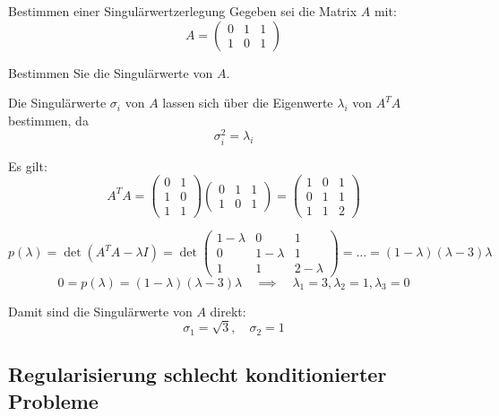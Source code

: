 \begin{example}{Bestimmen einer Singulärwertzerlegung}
    Gegeben sei die Matrix $A$  mit:
    \[
        A =
        \begin{pmatrix}
            0 & 1 & 1 \\
            1 & 0 & 1
        \end{pmatrix}
    \]

    Bestimmen Sie die Singulärwerte von $A$.

    \exampleseparator

    Die Singulärwerte $\sigma_i$ von $A$ lassen sich über die Eigenwerte $\lambda_i$ von $A^TA$ bestimmen, da
    \[
        \sigma_i^2 = \lambda_i
    \]

    Es gilt:
    \[
        A^TA =
        \begin{pmatrix}
            0 & 1 \\
            1 & 0 \\
            1 & 1
        \end{pmatrix}
        \begin{pmatrix}
            0 & 1 & 1 \\
            1 & 0 & 1
        \end{pmatrix}
        =
        \begin{pmatrix}
            1 & 0 & 1 \\
            0 & 1 & 1 \\
            1 & 1 & 2
        \end{pmatrix}
    \]

    \[
        p(\lambda) = \det(A^TA - \lambda I) = \det
        \begin{pmatrix}
            1 - \lambda & 0           & 1           \\
            0           & 1 - \lambda & 1           \\
            1           & 1           & 2 - \lambda
        \end{pmatrix}
        = \ldots = (1-\lambda)(\lambda-3)\lambda
    \]
    \[
        0 = p(\lambda) = (1-\lambda)(\lambda-3)\lambda \quad \implies \quad \lambda_1 = 3, \lambda_2 = 1, \lambda_3 = 0
    \]

    Damit sind die Singulärwerte von $A$ direkt:
    \[
        \sigma_1 = \sqrt{3}, \quad \sigma_2 = 1
    \]


\end{example}

\subsection{Regularisierung schlecht konditionierter Probleme}

